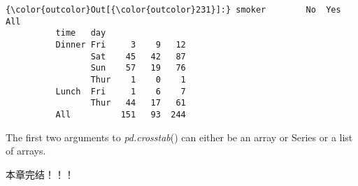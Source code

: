 \documentclass[11pt]{article}
\begin{document}
\begin{Verbatim}[commandchars=\\\{\}]
{\color{outcolor}Out[{\color{outcolor}231}]:} smoker        No  Yes  All
          time   day                
          Dinner Fri     3    9   12
                 Sat    45   42   87
                 Sun    57   19   76
                 Thur    1    0    1
          Lunch  Fri     1    6    7
                 Thur   44   17   61
          All          151   93  244
\end{Verbatim}
            
    The first two arguments to \emph{pd.crosstab}() can either be an array
or Series or a list of arrays.

    本章完结！！！


    
    
    
    
\end{document}
